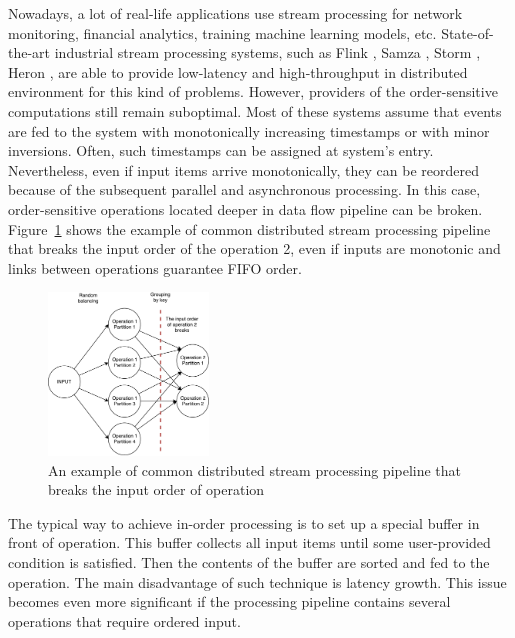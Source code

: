 
\label {fs-intro}

Nowadays, a lot of real-life applications use stream processing for network monitoring, financial analytics, training machine learning models, etc. State-of-the-art industrial stream processing systems, such as Flink \cite{carbone2015apache}, Samza \cite{Noghabi:2017:SSS:3137765.3137770}, Storm \cite{apache:storm}, Heron \cite{Kulkarni:2015:THS:2723372.2742788}, are able to provide low-latency and high-throughput in distributed environment for this kind of problems. However, providers of the order-sensitive computations still remain suboptimal. Most of these systems assume that events are fed to the system with monotonically increasing timestamps or with minor inversions. Often, such timestamps can be assigned at system's entry. Nevertheless, even if input items arrive monotonically, they can be reordered because of the subsequent parallel and asynchronous processing. In this case, order-sensitive operations located deeper in data flow pipeline can be broken. Figure~\ref{break-order-dataflow} shows the example of common distributed stream processing pipeline that breaks the input order of the operation 2, even if inputs are monotonic and links between operations guarantee FIFO order.

\begin{figure}[htbp]
  \centering
  \includegraphics[width=0.38\textwidth]{pics/break_order_pipeline}
  \caption{An example of common distributed stream processing pipeline that breaks the input order of operation}
  \label {break-order-dataflow}
\end{figure}

The typical way to achieve in-order processing is to set up a special buffer in front of operation. This buffer collects all input items until some user-provided condition is satisfied. Then the contents of the buffer are sorted and fed to the operation. The main disadvantage of such technique is latency growth. This issue becomes even more significant if the processing pipeline contains several operations that require ordered input. 

